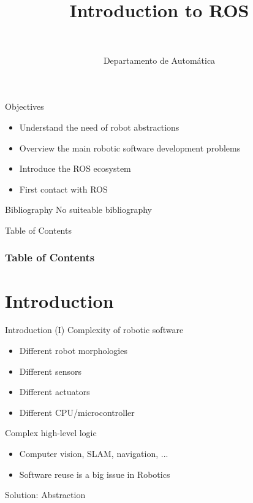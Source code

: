 \documentclass[10pt,compress]{beamer} %
\title[Introduction to ROS]{Introduction to ROS}
\author{\asignatura\\\carrera}
\institute{}
\date{Departamento de Automática}
\begin{document}
{\titlepageBlue
    \begin{frame}
        \titlepage
    \end{frame}
}

\begin{frame}[plain]{}
   \begin{block}{Objectives}
       \begin{itemize}
        \item Understand the need of robot abstractions
        \item Overview the main robotic software development problems
        \item Introduce the ROS ecosystem
        \item First contact with ROS
       \end{itemize}
   \end{block}

   \begin{block}{Bibliography}
       No suiteable bibliography
   \end{block}
\end{frame}

{
\begin{frame}[shrink]{Table of Contents}
 \frametitle{Table of Contents}
 \tableofcontents
\end{frame}
}

\section{Introduction}

\begin{frame}{Introduction (I)}
	Complexity of robotic software
	\begin{itemize}
		\item Different robot morphologies
		\item Different sensors
		\item Different actuators
		\item Different CPU/microcontroller
  	\end{itemize}
	Complex high-level logic
	\begin{itemize}
		\item Computer vision, SLAM, navigation, ...
		\item Software reuse is a big issue in Robotics
	\end{itemize}
	Solution: Abstraction
\end{frame}
\end{document}
